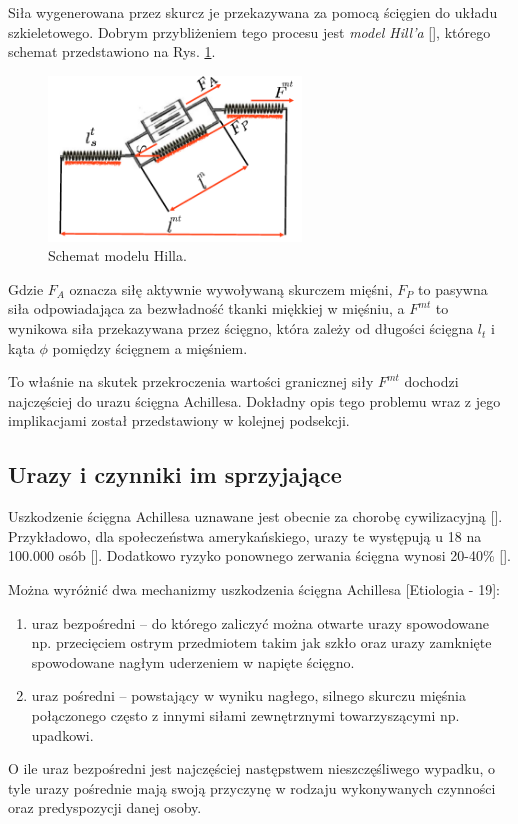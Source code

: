 Siła wygenerowana przez skurcz je przekazywana za pomocą ścięgien do układu szkieletowego. Dobrym przybliżeniem tego procesu jest \textit{model Hill'a} [], którego schemat przedstawiono na Rys. \ref{hill-model}.

\begin{figure}[h!]
	\centering
	\includegraphics[width=0.6\textwidth]{figures/Hill.png}
	\caption{Schemat modelu Hilla.}
	\label{hill-model}
\end{figure}

Gdzie $F_A$ oznacza siłę aktywnie wywoływaną skurczem mięśni, $F_P$ to pasywna siła odpowiadająca za bezwładność tkanki miękkiej w mięśniu, a $F^{mt}$ to wynikowa siła przekazywana przez ścięgno, która zależy od długości ścięgna $l_t$ i kąta $\phi$ pomiędzy ścięgnem a mięśniem. 

To właśnie na skutek przekroczenia wartości granicznej siły $F^{mt}$ dochodzi najczęściej do urazu ścięgna Achillesa. Dokładny opis tego problemu wraz z jego implikacjami został przedstawiony w kolejnej podsekcji.

\subsection{Urazy i czynniki im sprzyjające}

Uszkodzenie ścięgna Achillesa uznawane jest obecnie za chorobę cywilizacyjną []. Przykładowo, dla społeczeństwa amerykańskiego, urazy te występują u 18 na 100.000 osób []. Dodatkowo ryzyko ponownego zerwania ścięgna wynosi 20-40\% []. 

Można wyróżnić dwa mechanizmy uszkodzenia ścięgna Achillesa [Etiologia - 19]: 
\begin{enumerate}
	\item uraz bezpośredni -- do którego zaliczyć można otwarte urazy spowodowane np. przecięciem ostrym przedmiotem takim jak szkło oraz urazy zamknięte spowodowane nagłym uderzeniem w napięte ścięgno.
	\item uraz pośredni -- powstający w wyniku nagłego, silnego skurczu mięśnia połączonego często z innymi siłami zewnętrznymi towarzyszącymi np. upadkowi.
\end{enumerate}
O ile uraz bezpośredni jest najczęściej następstwem nieszczęśliwego wypadku, o tyle urazy pośrednie mają swoją przyczynę w rodzaju wykonywanych czynności oraz predyspozycji danej osoby. 

